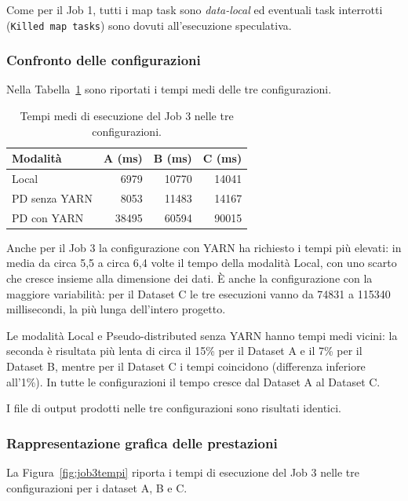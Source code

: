 \documentclass[12pt, a4paper]{article}
\begin{document}
Come per il Job 1, tutti i map task sono
\textit{data-local} ed eventuali task interrotti
(\texttt{Killed map tasks}) sono dovuti all'esecuzione
speculativa.

\subsubsection{Confronto delle configurazioni}

Nella Tabella~\ref{tab:job3confronto} sono riportati
i tempi medi delle tre configurazioni.

\begin{table}[H]
\centering
\small
\begin{tabular}{|l|r|r|r|}
\hline
\textbf{Modalità} &
\textbf{A (ms)} &
\textbf{B (ms)} &
\textbf{C (ms)} \\
\hline
Local & 6979 & 10770 & 14041 \\
PD senza YARN & 8053 & 11483 & 14167 \\
PD con YARN & 38495 & 60594 & 90015 \\
\hline
\end{tabular}
\caption{Tempi medi di esecuzione del Job 3 nelle tre configurazioni.}
\label{tab:job3confronto}
\end{table}

Anche per il Job 3 la configurazione con YARN
ha richiesto i tempi più elevati: in media da circa 5,5
a circa 6,4 volte il tempo della modalità Local, con uno
scarto che cresce insieme alla dimensione dei dati.
È anche la configurazione con la maggiore variabilità:
per il Dataset C le tre esecuzioni vanno da 74831
a 115340 millisecondi, la più lunga dell'intero progetto.

Le modalità Local e Pseudo-distributed senza YARN
hanno tempi medi vicini: la seconda è risultata più lenta
di circa il 15\% per il Dataset A e il 7\% per il Dataset B,
mentre per il Dataset C i tempi coincidono (differenza
inferiore all'1\%).
In tutte le configurazioni il tempo cresce
dal Dataset A al Dataset C.

I file di output prodotti nelle tre configurazioni
sono risultati identici.

\needspace{10cm}
\subsubsection{Rappresentazione grafica delle prestazioni}

La Figura~\ref{fig:job3tempi} riporta i tempi
di esecuzione del Job 3 nelle tre configurazioni
per i dataset A, B e C.
\end{document}
